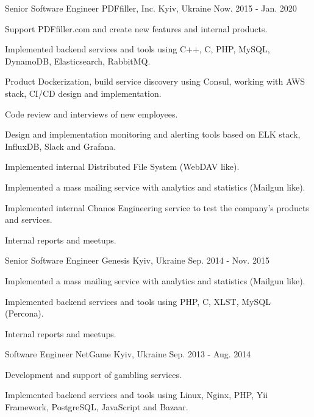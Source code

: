 \begin{cventries}
  \cventry
    {Senior Software Engineer}
    {PDFfiller, Inc.}
    {Kyiv, Ukraine}
    {Now. 2015 - Jan. 2020}
    {
      \begin{cvitems}
        \item {Support PDFfiller.com and create new features and internal products.}
        \item {Implemented backend services and tools using C++, C, PHP, MySQL, DynamoDB, Elasticsearch, RabbitMQ.}
        \item {Product Dockerization, build service discovery using Consul, working with AWS stack, CI/CD design and implementation.}
        \item {Code review and interviews of new employees. }
        \item {Design and implementation monitoring and alerting tools based on ELK stack, InfluxDB, Slack and Grafana.}
        \item {Implemented internal Distributed File System (WebDAV like).}
        \item {Implemented a mass mailing service with analytics and statistics (Mailgun like).}
        \item {Implemented internal Chanos Engineering service to test the company's products and services.}
        \item {Internal reports and meetups.}
      \end{cvitems}
    }

  \cventry
    {Senior Software Engineer}
    {Genesis}
    {Kyiv, Ukraine}
    {Sep. 2014 - Nov. 2015}
    {
      \begin{cvitems}
        \item {Implemented a mass mailing service with analytics and statistics (Mailgun like).}
        \item {Implemented backend services and tools using PHP, C, XLST, MySQL (Percona).}
        \item {Internal reports and meetups.}
      \end{cvitems}
    }

  \cventry
    {Software Engineer}
    {NetGame}
    {Kyiv, Ukraine}
    {Sep. 2013 - Aug. 2014}
    {
      \begin{cvitems}
        \item {Development and support of gambling services.}
        \item {Implemented backend services and tools using Linux, Nginx, PHP, Yii Framework, PostgreSQL, JavaScript and Bazaar.}
      \end{cvitems}
    }


\end{cventries}
